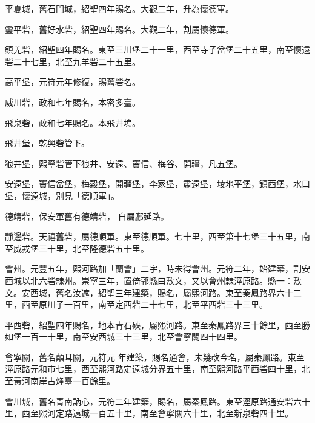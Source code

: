 \begin{pinyinscope}
 平夏城，舊石門城，紹聖四年賜名。大觀二年，升為懷德軍。



 靈平砦，舊好水砦，紹聖四年賜名。大觀二年，割屬懷德軍。



 鎮羌砦，紹聖四年賜名。東至三川堡二十一里，西至寺子岔堡二十五里，南至懷遠砦二十七里，北至九羊砦二十五里。



 高平堡，元符元年修復，賜舊砦名。



 威川砦，政和七年賜名，本密多臺。



 飛泉砦，政和七年賜名。本飛井塢。



 飛井堡，乾興砦管下。



 狼井堡，熙寧砦管下狼井、安遠、竇信、梅谷、開疆，凡五堡。



 安遠堡，竇信岔堡，梅穀堡，開疆堡，李家堡，肅遠堡，堎地平堡，鎮西堡，水口堡，懷遠城，別見「德順軍」。



 德靖砦，保安軍舊有德靖砦，
 自屬鄜延路。



 靜邊砦。天禧舊砦，屬德順軍。東至德順軍。七十里，西至第十七堡三十五里，南至威戎堡三十里，北至隆德砦五十里。



 會州。元豐五年，熙河路加「蘭會」二字，時未得會州。元符二年，始建築，割安西城以北六砦隸州。崇寧三年，置倚郭縣曰敷文，又以會州隸涇原路。縣一：敷文。安西城，舊名汝遮，紹聖三年建築，賜名，屬熙河路。東至秦鳳路界六十二里，西至原川子一百里，南至定西砦二十七里，北至平西砦三十三里。



 平西砦，紹聖四年賜名，地本青石硤，屬熙河路。東至秦鳳路界三十餘里，西至勝如堡一百一十里，南至安西城三十三里，北至會寧關四十四里。



 會寧關，舊名顛耳關，元符元
 年建築，賜名通會，未幾改今名，屬秦鳳路。東至涇原路元和市七里，西至熙河路定遠城分界五十里，南至熙河路平西砦四十里，北至黃河南岸古烽臺一百餘里。



 會川城，舊名青南訥心，元符二年建築，賜名，屬秦鳳路。東至涇原路通安砦六十里，西至熙河定路遠城一百五十里，南至會寧關六十里，北至新泉砦四十里。




\end{pinyinscope}
